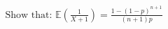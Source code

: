 \documentclass[preview]{standalone}
\begin{document}
\begin{align*}
\text{Show that: } \mathbb{E}\left(\frac{1}{X+1}\right) = \frac{1 - (1-p)^{n+1}}{(n+1)p}
\end{align*}
\end{document}
